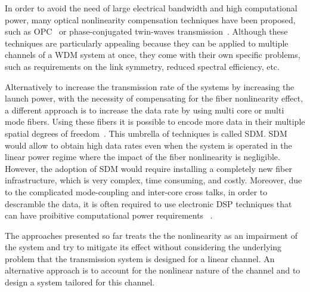 In order to avoid the need of large electrical bandwidth and high computational
power, many optical nonlinearity compensation techniques have been proposed, such
as \ac{OPC}~\cite{sackey2015kerr,Ellis:16} or phase-conjugated twin-waves
transmission~\cite{liu2015twin}. Although these techniques are particularly appealing
because they can be applied to multiple channels of a \ac{WDM} system at once,
they come with their own specific problems, such as requirements on the link symmetry, reduced spectral efficiency, etc.

Alternatively to increase the transmission rate of the systems by increasing
the launch power, with the necessity of compensating for the fiber nonlinearity
effect, a different approach is to increase the data rate by using multi core
or multi mode fibers. Using these fibers it is possible to encode more data in their multiple spatial degrees of
freedom~\cite{richardson2013space, puttnam20152, yi2018transmission}. This umbrella of techniques is called \ac{SDM}.
\ac{SDM} would allow to obtain high data rates even when the system is operated
in the linear power regime where the impact of the fiber nonlinearity is negligible.
However, the adoption of \ac{SDM} would require installing a completely new
fiber infrastructure, which is very complex, time consuming, and costly. Moreover,
due to the complicated mode-coupling and inter-core cross talks, in order to
descramble the data, it is often required to use electronic \ac{DSP} techniques that can have proibitive computational power requirements
~\cite{richardson2013space}.

The approaches presented so far treats the the nonlinearity as an impairment of the system and try to mitigate its effect without considering the underlying problem that the transmission system is designed for a linear channel. An alternative approach is to account for the nonlinear nature of the channel and to design a system tailored for this channel.

